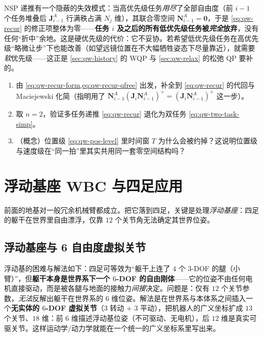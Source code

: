 \begin{pitfall}[误区：优先级用尽时低优先级仍能被满足]
NSP 递推有一个隐蔽的失效模式：当高优先级任务\emph{用尽}了全部自由度（前 $i-1$ 个任务堆叠后 $\boldsymbol{J}_{i-1}^A$ 行满秩占满 $N_j$ 维），其联合零空间 $\boldsymbol{N}_{i-1}^A=\mathbf{0}$，于是 \cref{eq:qw-recur} 的修正项整体为零——\textbf{任务 $i$ 及之后的所有低优先级任务被\emph{完全}放弃}，没有任何“折中”余地。这是硬优先级的代价：它不妥协。若希望低优先级任务在高优先级“略微让步”下也能改善（如望远镜位置在不大幅牺牲姿态下尽量靠近），就需要\emph{软}优先级——这正是 \cref{sec:qw-history} 的 WQP 与 \cref{sec:qw-relax} 的松弛 QP 要补的。
\end{pitfall}

\begin{practice}
\begin{enumerate}
  \item 由 \cref{eq:qw-recur-form,eq:qw-recur-qfree} 出发，补全到 \cref{eq:qw-recur} 的代回与 Maciejewski 化简（指明用了 $\boldsymbol{N}_{i-1}^A(\boldsymbol{J}_i\boldsymbol{N}_{i-1}^A)^+=(\boldsymbol{J}_i\boldsymbol{N}_{i-1}^A)^+$ 这一步）。
  \item 取 $n=2$，验证多任务递推 \cref{eq:qw-recur} 退化为双任务 \cref{eq:qw-two-task-simp}。
  \item （概念）位置级 \cref{eq:qw-pos-level} 里时间窗 $T$ 为什么会被约掉？这说明位置级与速度级在“同一拍”里其实共用同一套零空间结构吗？
\end{enumerate}
\end{practice}

\section{浮动基座 WBC 与四足应用}
\label{sec:qw-floating}

前面的地基对一般冗余机械臂都成立。把它落到四足，关键是处理\emph{浮动基座}：四足的躯干在世界里自由漂浮，仅靠 $12$ 个关节角无法确定其世界位姿。

\subsection{浮动基座与 6 自由度虚拟关节}
\label{subsec:qw-virtual-joint}

\begin{insight}\label{ins:qw-virtual}
浮动基的困难与解法如下：四足可等效为“躯干上连了 $4$ 个 $3$-DOF 的腿（小臂）”，但\textbf{躯干本身是世界系下一个 $6$-DOF 的自由刚体}——它的位姿不由任何电机直接驱动，而是被各腿与地面的接触力\emph{间接}决定。问题是：仅有 $12$ 个关节参数，\emph{无法}反解出躯干在世界系的 $6$ 维位姿。解法是在世界系与本体系之间插入一个\textbf{无实体的 $6$-DOF 虚拟关节}（$3$ 转动 $+$ $3$ 平动），把机器人的广义坐标扩成 $13$ 个关节、$18$ 维：前 $6$ 维描述浮动基位姿（不可驱动、无电机），后 $12$ 维是真实可驱关节。这样运动学/动力学就能在一个统一的广义坐标系里写出来。
\end{insight}

